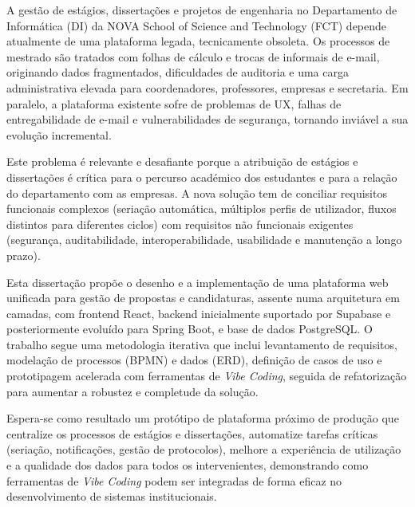 
%

{
  A gestão de estágios, dissertações e projetos de engenharia no Departamento de Informática (DI) da NOVA School of Science and Technology (FCT) depende atualmente 
  de uma plataforma legada, tecnicamente obsoleta. 
  Os processos de mestrado são tratados com folhas de cálculo e trocas de informais de e-mail, originando dados fragmentados, dificuldades de auditoria
  e uma carga administrativa elevada para coordenadores, professores, empresas e secretaria.
  Em paralelo, a plataforma existente sofre de problemas de UX, falhas de entregabilidade de e-mail e vulnerabilidades de segurança, tornando
  inviável a sua evolução incremental.
}

{
  Este problema é relevante e desafiante porque a atribuição de estágios e dissertações é crítica para o percurso académico dos estudantes e para a relação 
  do departamento com as empresas. 
  A nova solução tem de conciliar requisitos funcionais complexos (seriação automática, múltiplos perfis de utilizador, fluxos distintos para diferentes ciclos)
  com requisitos não funcionais exigentes (segurança, auditabilidade, interoperabilidade, usabilidade e manutenção a longo prazo).
}

{
  Esta dissertação propõe o desenho e a implementação de uma plataforma web unificada para gestão de propostas e candidaturas, assente numa arquitetura em camadas,
  com frontend React, backend inicialmente suportado por Supabase e posteriormente evoluído para Spring Boot, e base de dados PostgreSQL.
  O trabalho segue uma metodologia iterativa que inclui levantamento de requisitos, modelação de processos (BPMN) e dados (ERD), definição de casos de uso e prototipagem acelerada
  com ferramentas de \textit{Vibe Coding}, seguida de refatorização para aumentar a robustez e completude da solução.
}

{
  Espera-se como resultado um protótipo de plataforma próximo de produção que centralize os processos de estágios
  e dissertações, automatize tarefas críticas (seriação, notificações, gestão de protocolos), melhore a experiência de utilização
  e a qualidade dos dados para todos os intervenientes, demonstrando como ferramentas de \textit{Vibe Coding} podem ser integradas de forma eficaz no 
  desenvolvimento de sistemas institucionais.
}

